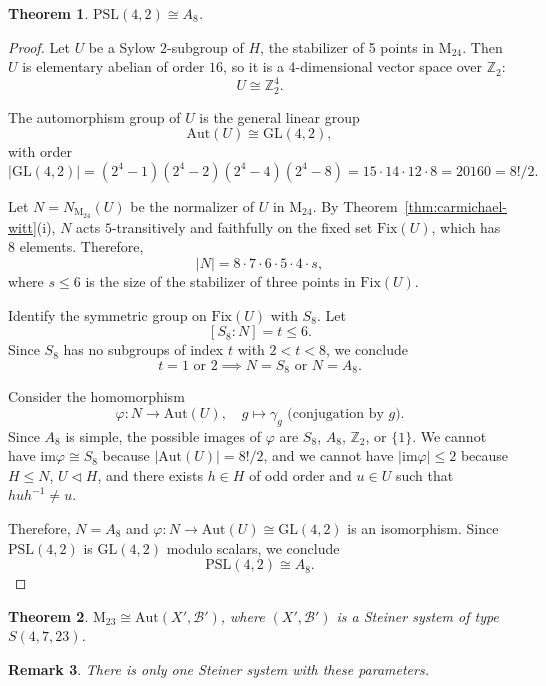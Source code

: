 \documentclass[12pt,a4paper,openany]{book}
\newtheorem{theorem}{Theorem}[section]
\newcommand{\PSL}{\mathrm{PSL}}
\newcommand{\Aut}{\mathrm{Aut}}
\newcommand{\Fix}{\mathrm{Fix}}
\newcommand{\GL}{\mathrm{GL}}
\newcommand{\im}{\mathrm{im}}
\renewcommand{\PSL}{\mathrm{PSL}}
\renewcommand{\GL}{\mathrm{GL}}
\renewcommand{\PSL}{\mathrm{PSL}}
\newcommand{\Z}{\mathbb{Z}}
\newtheorem{remark}[theorem]{Remark}
\begin{document}
\begin{theorem}\label{thm:PSL4-2}
$\PSL(4,2) \cong A_8$.
\end{theorem}

\begin{proof}
Let $U$ be a Sylow $2$-subgroup of $H$, the stabilizer of 5 points in $\mathrm{M}_{24}$. 
Then $U$ is elementary abelian of order $16$, so it is a $4$-dimensional vector space over $\Z_2$:
\[
U \cong \Z_2^4.
\]

The automorphism group of $U$ is the general linear group
\[
\Aut(U) \cong \GL(4,2),
\]
with order
\[
|\GL(4,2)| = (2^4 - 1)(2^4 - 2)(2^4 - 4)(2^4 - 8) = 15 \cdot 14 \cdot 12 \cdot 8 = 20160 = 8!/2.
\]

Let $N = N_{\mathrm{M}_{24}}(U)$ be the normalizer of $U$ in $\mathrm{M}_{24}$. By Theorem~\ref{thm:carmichael-witt}(i), $N$ acts $5$-transitively and faithfully on the fixed set $\Fix(U)$, which has 8 elements. Therefore,
\[
|N| = 8 \cdot 7 \cdot 6 \cdot 5 \cdot 4 \cdot s,
\]
where $s \le 6$ is the size of the stabilizer of three points in $\Fix(U)$.

Identify the symmetric group on $\Fix(U)$ with $S_8$. Let
\[
[S_8 : N] = t \le 6.
\]
Since $S_8$ has no subgroups of index $t$ with $2 < t < 8$, we conclude
\[
t = 1 \text{ or } 2 \implies N = S_8 \text{ or } N = A_8.
\]

Consider the homomorphism
\[
\varphi: N \to \Aut(U), \quad g \mapsto \gamma_g \text{ (conjugation by } g\text{).}
\]
Since $A_8$ is simple, the possible images of $\varphi$ are $S_8$, $A_8$, $\Z_2$, or $\{1\}$.  
We cannot have $\im \varphi \cong S_8$ because $|\Aut(U)| = 8!/2$, and we cannot have $|\im \varphi| \le 2$ because $H \le N$, $U \triangleleft H$, and there exists $h \in H$ of odd order and $u \in U$ such that $h u h^{-1} \neq u$.

Therefore, $N = A_8$ and $\varphi: N \to \Aut(U) \cong \GL(4,2)$ is an isomorphism. Since $\PSL(4,2)$ is $\GL(4,2)$ modulo scalars, we conclude
\[
\PSL(4,2) \cong A_8.
\]
\end{proof}

\begin{theorem}\label{thm:M23-aut}
$\mathrm{M}_{23} \cong \Aut(X', \mathscr{B}')$, where $(X', \mathscr{B}')$ is a Steiner system of type $S(4, 7, 23)$.
\end{theorem}

\begin{remark}
There is only one Steiner system with these parameters.
\end{remark}
\end{document}
